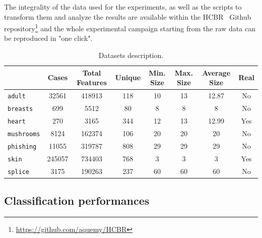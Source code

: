 \documentclass[preprint,12pt]{elsarticle}
\def\HCBR{{\sc HCBR}}
\theoremstyle{definition}
\begin{document}
The integrality of the data used for the experiments, as well as the scripts to transform them and analyze the results are available within the \HCBR~ Github repository\footnote{\href{https://github.com/aquemy/HCBR}{https://github.com/aquemy/HCBR}} and the whole experimental campaign starting from the raw data can be reproduced in "one click". 

\begin{table}[tb]
\begin{center}
  \caption{Datasets description. }
  \begin{small}
  \begin{tabular}{|l|c|c|c|c|c|c|c|}
    \hline
     & Cases & Total Features & Unique & Min. Size & Max. Size & Average Size & Real \\
    \hline
    \texttt{adult} & 32561 & 418913 & 118 & 10 & 13 & 12.87 & No\\
    \texttt{breasts} & 699 & 5512 & 80 & 8 & 8 & 8 & No \\
    \texttt{heart} & 270 & 3165 & 344 & 12 & 13 & 12.99 & Yes\\
    \texttt{mushrooms} & 8124 & 162374 & 106 & 20 & 20 & 20 & No\\
    \texttt{phishing} & 11055 & 319787 & 808 & 29 & 29 & 29 & No\\
    \texttt{skin} & 245057 & 734403 & 768 & 3 & 3 & 3 & Yes\\
    \texttt{splice} & 3175 & 190263 & 237 & 60 & 60 & 60 & No\\
    \hline
  \end{tabular}
  \end{small}
  \label{table:dataset}
\end{center}
\end{table}
\subsection{Classification performances}
\label{sec:classification_performances}
\end{document}
